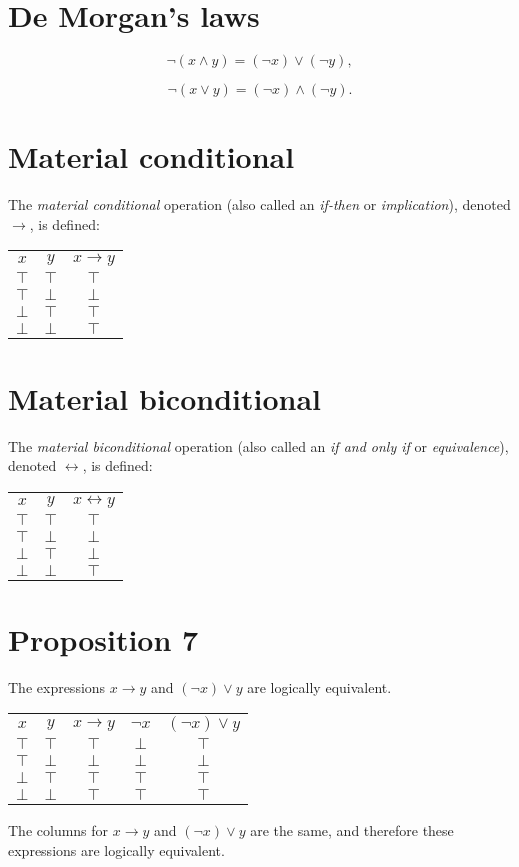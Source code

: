 \documentclass[12pt]{article}
\begin{document}
\section*{De Morgan's laws}
\[\lnot(x\land y)=(\lnot x)\lor(\lnot y),\]

\[\lnot(x\lor y)=(\lnot x)\land(\lnot y).\]
\section*{Material conditional}
The \textit{material conditional} operation (also called an \textit{if-then} or \textit{implication}), denoted $\rightarrow$, is defined:
\begin{center}
\begin{tabular}{c|c||c}
$x$&$y$&$x\rightarrow y$\\
$\top$&$\top$&$\top$\\
$\top$&$\bot$&$\bot$\\
$\bot$&$\top$&$\top$\\
$\bot$&$\bot$&$\top$
\end{tabular}
\end{center}
\section*{Material biconditional}
The \textit{material biconditional} operation (also called an \textit{if and only if} or \textit{equivalence}), denoted $\leftrightarrow$, is defined:
\begin{center}
\begin{tabular}{c|c||c}
$x$&$y$&$x\leftrightarrow y$\\
$\top$&$\top$&$\top$\\
$\top$&$\bot$&$\bot$\\
$\bot$&$\top$&$\bot$\\
$\bot$&$\bot$&$\top$
\end{tabular}
\end{center}
\section*{Proposition 7}
The expressions $x\rightarrow y$ and $(\lnot x)\lor y$ are logically equivalent.
\begin{center}
\begin{tabular}{c|c|c|c|c}
$x$&$y$&$x\rightarrow y$&$\lnot x$&$(\lnot x)\lor y$\\
$\top$&$\top$&$\top$&$\bot$&$\top$\\
$\top$&$\bot$&$\bot$&$\bot$&$\bot$\\
$\bot$&$\top$&$\top$&$\top$&$\top$\\
$\bot$&$\bot$&$\top$&$\top$&$\top$
\end{tabular}
\end{center}
The columns for $x\rightarrow y$ and $(\lnot x)\lor y$ are the same, and therefore these expressions are logically equivalent.
\end{document}
